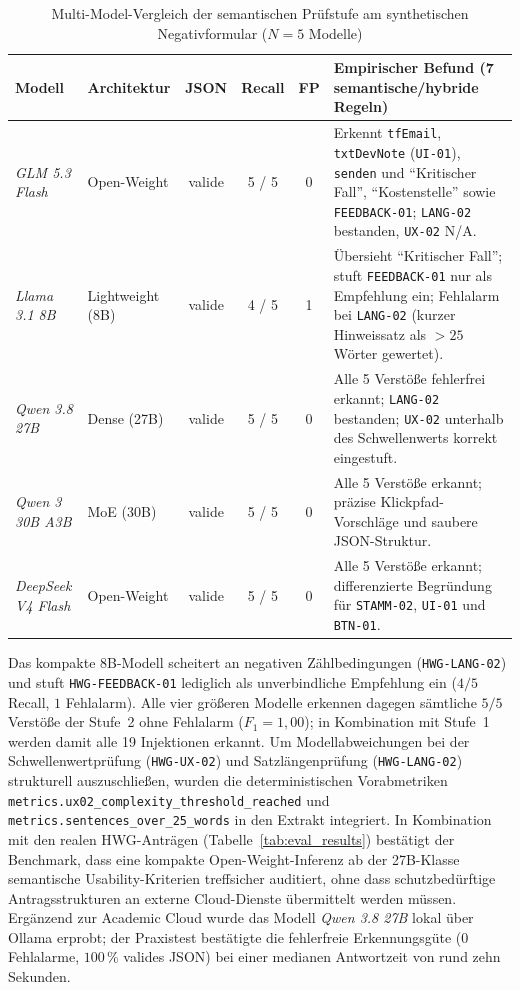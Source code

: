 \begin{table}[htbp]
\centering
\scriptsize
\renewcommand{\arraystretch}{1.05}
\begin{tabularx}{\textwidth}{>{\raggedright\arraybackslash}p{2.1cm}>{\raggedright\arraybackslash}p{2.2cm}ccc>{\raggedright\arraybackslash}X}
\toprule
\textbf{Modell} & \textbf{Architektur} & \textbf{JSON} & \textbf{Recall} & \textbf{FP} & \textbf{Empirischer Befund (7 semantische/hybride Regeln)} \\
\midrule
\textit{GLM 5.3 Flash} & Open-Weight & valide & 5 / 5 & 0 & Erkennt \texttt{tfEmail}, \texttt{txtDevNote} (\texttt{UI-01}), \texttt{senden} und \enquote{Kritischer Fall}, \enquote{Kostenstelle} sowie \texttt{FEEDBACK-01}; \texttt{LANG-02} bestanden, \texttt{UX-02} N/A. \\
\textit{Llama 3.1 8B} & Lightweight (8B) & valide & 4 / 5 & 1 & Übersieht \enquote{Kritischer Fall}; stuft \texttt{FEEDBACK-01} nur als Empfehlung ein; Fehlalarm bei \texttt{LANG-02} (kurzer Hinweissatz als $>25$ Wörter gewertet). \\
\textit{Qwen 3.8 27B} & Dense (27B) & valide & 5 / 5 & 0 & Alle 5 Verstöße fehlerfrei erkannt; \texttt{LANG-02} bestanden; \texttt{UX-02} unterhalb des Schwellenwerts korrekt eingestuft. \\
\textit{Qwen 3 30B A3B} & MoE (30B) & valide & 5 / 5 & 0 & Alle 5 Verstöße erkannt; präzise Klickpfad-Vorschläge und saubere JSON-Struktur. \\
\textit{DeepSeek V4 Flash} & Open-Weight & valide & 5 / 5 & 0 & Alle 5 Verstöße erkannt; differenzierte Begründung für \texttt{STAMM-02}, \texttt{UI-01} und \texttt{BTN-01}. \\
\bottomrule
\end{tabularx}
\caption{Multi-Model-Vergleich der semantischen Prüfstufe am synthetischen Negativformular ($N = 5$ Modelle)}
\label{tab:model_comparison}
\end{table}

Das kompakte 8B-Modell scheitert an negativen Zählbedingungen (\texttt{HWG-LANG-02}) und stuft \texttt{HWG-FEEDBACK-01} lediglich als unverbindliche Empfehlung ein ($4/5$ Recall, $1$ Fehlalarm). Alle vier größeren Modelle erkennen dagegen sämtliche $5/5$ Verstöße der Stufe~2 ohne Fehlalarm ($F_1 = 1{,}00$); in Kombination mit Stufe~1 werden damit alle 19 Injektionen erkannt. Um Modellabweichungen bei der Schwellenwertprüfung (\texttt{HWG-UX-02}) und Satzlängenprüfung (\texttt{HWG-LANG-02}) strukturell auszuschließen, wurden die deterministischen Vorabmetriken \texttt{metrics.ux02\_complexity\_threshold\_reached} und \texttt{metrics.sentences\_over\_25\_words} in den Extrakt integriert. In Kombination mit den realen HWG-Anträgen (Tabelle~\ref{tab:eval_results}) bestätigt der Benchmark, dass eine kompakte Open-Weight-Inferenz ab der 27B-Klasse semantische Usability-Kriterien treffsicher auditiert, ohne dass schutzbedürftige Antragsstrukturen an externe Cloud-Dienste übermittelt werden müssen. Ergänzend zur Academic Cloud wurde das Modell \textit{Qwen 3.8 27B} lokal über Ollama erprobt; der Praxistest bestätigte die fehlerfreie Erkennungsgüte ($0$ Fehlalarme, $100\,\%$ valides JSON) bei einer medianen Antwortzeit von rund zehn Sekunden.

